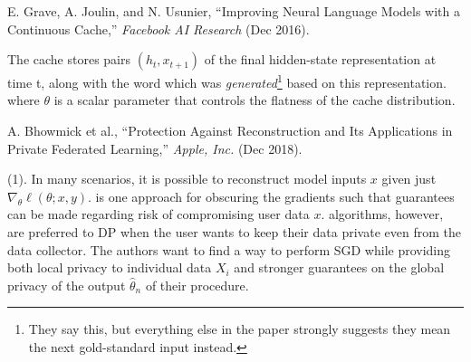 \documentclass[11pt]{article}
\newcommand\p{\Needspace{10\baselineskip} \noindent}
\begin{document}
\vspace{-1em}
{\footnotesize E. Grave, A. Joulin, and N. Usunier, ``Improving Neural Language Models with a Continuous Cache,'' \textit{Facebook AI Research} (Dec 2016).}

The cache stores pairs $(h_t, x_{t+1})$ of the final hidden-state representation at time t, along with the word which was \textit{generated}\footnote{They say this, but everything else in the paper strongly suggests they mean the next gold-standard input instead.} based on this representation. 
where $\theta$ is a scalar parameter that controls the flatness of the cache distribution. 











\vspace{-1em}
{\footnotesize A. Bhowmick et al., ``Protection Against Reconstruction and Its Applications in Private Federated Learning,'' \textit{Apple, Inc.} (Dec 2018).}


\p {} (1). In many scenarios, it is possible to reconstruct model inputs $x$ given just $\nabla_{\theta} \ell (\theta; x, y)$.  is one approach for obscuring the gradients such that guarantees can be made regarding risk of compromising user data $x$.  algorithms, however, are preferred to DP when the user wants to keep their data private even from the data collector. The authors want to find a way to perform SGD while providing both local privacy to individual data $X_i$ and stronger guarantees on the global privacy of the output $\hat \theta_n$ of their procedure. \\
\end{document}
